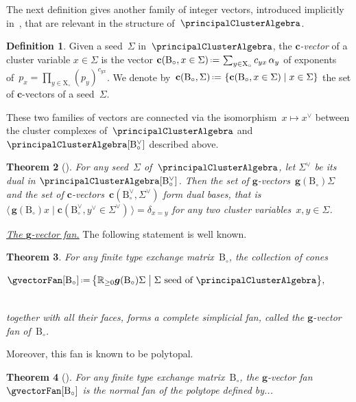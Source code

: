\documentclass{amsart}
\newtheorem{theorem}{Theorem}[section]
\theoremstyle{definition}
\newtheorem{definition}[theorem]{Definition}
\newcommand{\R}{\mathbb{R}} %
\renewcommand{\b}[1]{{\boldsymbol{#1}}} %
\newcommand{\set}[2]{\left\{ #1 \;\middle|\; #2 \right\}} %
\newcommand{\bigset}[2]{\big\{ #1 \;\big|\; #2 \big\}} %
\newcommand{\bigdotprod}[2]{\big\langle \, #1 \; \big| \; #2 \, \big\rangle} %
\newcommand{\eqdef}{\mbox{\,\raisebox{0.2ex}{\scriptsize\ensuremath{\mathrm:}}\ensuremath{=}\,}} %
\newcommand{\darkblue}{\color{darkblue}} %
\newcommand{\defn}[1]{\textsl{\darkblue #1}} %
\newcommand{\para}[1]{\medskip\noindent\uline{\textit{#1.}}} %
\newcommand{\vincent}[1]{\todo[color=blue!30]{#1 \\ \hfill --- V.}}
\newcommand{\gvector}[1]{\b{g}(#1)} %
\newcommand{\gvectors}[1]{\b{g}(#1)} %
\newcommand{\cvector}[3]{\mathbf{c}(#1, #3 \in #2)} %
\newcommand{\cvectors}[2]{\mathbf{c}(#1, #2)} %
\newcommand{\seed}{\Sigma} %
\newcommand{\cluster}{\mathrm{X}} %
\newcommand{\B}{\mathrm{B}} %
\newcommand{\simpleRoot}{\alpha} %
\begin{document}
The next definition gives another family of integer vectors, introduced implicitly in~\cite{FominZelevinsky-ClusterAlgebrasIV}, that are relevant in the structure of~$\principalClusterAlgebra$.

\begin{definition}
Given a seed~$\seed$ in~$\principalClusterAlgebra$, the \defn{$\b{c}$-vector} of a cluster variable $x \in \seed$ is the vector
\(
\cvector{\B_\circ}{\seed}{x} \eqdef \sum_{y \in \cluster_\circ} c_{yx} \, \simpleRoot_y
\)
of exponents of~$p_x = \prod_{y \in \cluster_\circ} (p_y)^{c_{yx}}$.
We denote by~$\cvectors{\B_\circ}{\seed} \eqdef \set{\cvector{\B_\circ}{\seed}{x}}{x \in \seed}$ the set of $\b{c}$-vectors of a seed~$\seed$.
\end{definition}

These two families of vectors are connected via the isomorphism~$x \mapsto x^\vee$ between the cluster complexes of~$\principalClusterAlgebra$ and~$\principalClusterAlgebra[\B_\circ^\vee]$ described above.

\begin{theorem}[{\cite[Theorem~1.2]{NakanishiZelevinsky}}]
\label{thm:duality}
For any seed~$\seed$ of~$\principalClusterAlgebra$, let $\seed^\vee$ be its dual in $\principalClusterAlgebra[\B_\circ^\vee]$.
Then the set of $\b{g}$-vectors~$\gvector{\B_\circ}{\seed}$ and the set of $\b{c}$-vectors~$\cvectors{\B_\circ^\vee}{\seed^\vee}$ form dual bases, that is
\(
{\bigdotprod{\gvector{\B_\circ}{x}}{\cvector{\B_\circ^\vee}{\seed^\vee}{y^\vee}} = \delta_{x=y}}
\)
for any two cluster variables~$x,y \in \seed$.
\end{theorem}

\para{The $\b{g}$-vector fan}
%
The following statement is well known.
\vincent{Explain}

\begin{theorem}
\label{thm:gvectorFan}
For any finite type exchange matrix~$\B_\circ$, the collection of cones \\[.1cm]
\centerline{
$\gvectorFan[\B_\circ] \eqdef \bigset{\R_{\ge0} \gvectors{\B_\circ}{\seed}}{\seed \text{ seed of } \principalClusterAlgebra},$
} \\[.1cm]
together with all their faces, forms a complete simplicial fan, called the \defn{$\b{g}$-vector fan} of~$\B_\circ$.
\end{theorem}

Moreover, this fan is known to be polytopal.

\begin{theorem}[{\cite[Thm.~26]{HohlwegPilaudStella}}]
\label{thm:gvectorFan}
For any finite type exchange matrix~$\B_\circ$, the $\b{g}$-vector fan~$\gvectorFan[\B_\circ]$ is the normal fan of the polytope defined by...
\vincent{TODO}
\end{theorem}
\end{document}
